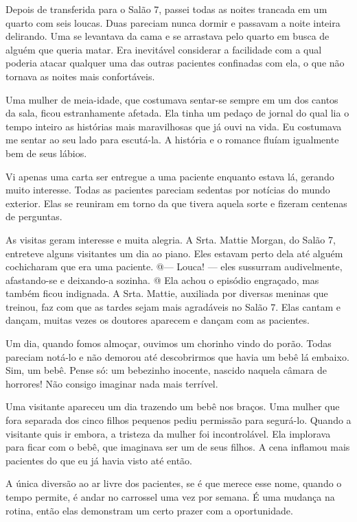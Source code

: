Depois de transferida para o Salão 7, passei todas as noites trancada em
um quarto com seis loucas. Duas pareciam nunca dormir e passavam a noite
inteira delirando. Uma se levantava da cama e se arrastava pelo quarto
em busca de alguém que queria matar. Era inevitável considerar a
facilidade com a qual poderia atacar qualquer uma das outras pacientes
confinadas com ela, o que não tornava as noites mais confortáveis.

Uma mulher de meia-idade, que costumava sentar-se sempre em um dos
cantos da sala, ficou estranhamente afetada. Ela tinha um pedaço de
jornal do qual lia o tempo inteiro as histórias mais maravilhosas que já
ouvi na vida. Eu costumava me sentar ao seu lado para escutá-la. A
história e o romance fluíam igualmente bem de seus lábios.

Vi apenas uma carta ser entregue a uma paciente enquanto estava lá,
gerando muito interesse. Todas as pacientes pareciam sedentas por
notícias do mundo exterior. Elas se reuniram em torno da que tivera
aquela sorte e fizeram centenas de perguntas.

As visitas geram interesse e muita alegria. A Srta. Mattie Morgan, do
Salão 7, entreteve alguns visitantes um dia ao piano. Eles estavam perto
dela até alguém cochicharam que era uma paciente. @--- Louca! --- eles
sussurram audivelmente, afastando-se e deixando-a sozinha. @ Ela achou o
episódio engraçado, mas também ficou indignada. A Srta. Mattie,
auxiliada por diversas meninas que treinou, faz com que as tardes sejam
mais agradáveis no Salão 7. Elas cantam e dançam, muitas vezes os
doutores aparecem e dançam com as pacientes.

Um dia, quando fomos almoçar, ouvimos um chorinho vindo do porão. Todas
pareciam notá-lo e não demorou até descobrirmos que havia um bebê lá
embaixo. Sim, um bebê. Pense só: um bebezinho inocente, nascido naquela
câmara de horrores! Não consigo imaginar nada mais terrível.

Uma visitante apareceu um dia trazendo um bebê nos braços. Uma mulher
que fora separada dos cinco filhos pequenos pediu permissão para
segurá-lo. Quando a visitante quis ir embora, a tristeza da mulher foi
incontrolável. Ela implorava para ficar com o bebê, que imaginava ser um
de seus filhos. A cena inflamou mais pacientes do que eu já havia visto
até então.

A única diversão ao ar livre dos pacientes, se é que merece esse nome,
quando o tempo permite, é andar no carrossel uma vez por semana. É uma
mudança na rotina, então elas demonstram um certo prazer com a
oportunidade.

